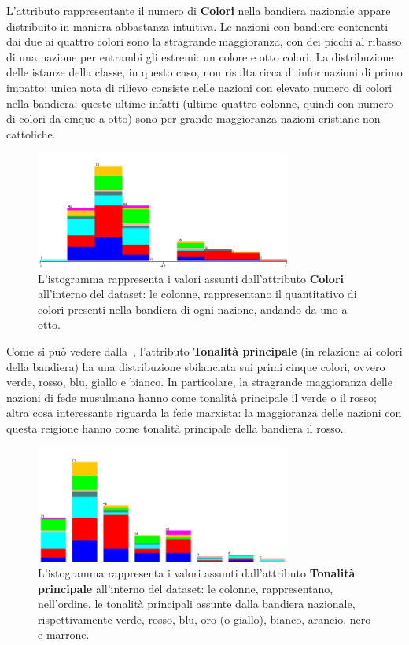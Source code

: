\documentclass[a4paper,11pt,twoside,notitlepage,final]{scrartcl}
\begin{document}
L'attributo rappresentante il numero di \textbf{Colori} nella bandiera nazionale appare distribuito in maniera abbastanza intuitiva.
Le nazioni con bandiere contenenti dai due ai quattro colori sono la stragrande maggioranza, con dei picchi al ribasso di una nazione per entrambi gli estremi: un colore e otto colori.
La distribuzione delle istanze della classe, in questo caso, non risulta ricca di informazioni di primo impatto: unica nota di rilievo consiste nelle nazioni con elevato numero di colori nella bandiera;
queste ultime infatti (ultime quattro colonne, quindi con numero di colori da cinque a otto) sono per grande maggioranza nazioni cristiane non cattoliche.

\begin{figure}[H]
  \centering
  \includegraphics[width=0.75\textwidth]{fig/religion-colours.jpg}%
  \caption{%
    L'istogramma rappresenta i valori assunti dall'attributo \textbf{Colori}
    all'interno del dataset: le colonne, rappresentano il quantitativo di colori presenti nella bandiera di ogni nazione, andando da uno a otto.
    }%
  \label{fig:colours}
\end{figure}

Come si può vedere dalla~, l'attributo \textbf{Tonalità principale} (in relazione ai colori della bandiera) ha una distribuzione sbilanciata sui primi cinque colori,
ovvero verde, rosso, blu, giallo e bianco. In particolare, la stragrande maggioranza delle nazioni di fede musulmana hanno come tonalità principale il verde o il rosso; altra cosa interessante riguarda la fede marxista:
la maggioranza delle nazioni con questa reigione hanno come tonalità principale della bandiera il rosso.

\begin{figure}[H]
  \centering
  \includegraphics[width=0.75\textwidth]{fig/religion-mainhue.jpg}%
  \caption{%
    L'istogramma rappresenta i valori assunti dall'attributo \textbf{Tonalità principale}
    all'interno del dataset: le colonne, rappresentano, nell'ordine, le tonalità principali assunte dalla bandiera nazionale, rispettivamente
    verde, rosso, blu, oro (o giallo), bianco, arancio, nero e marrone.
    }%
  \label{fig:mainhue}
\end{figure}
\end{document}
